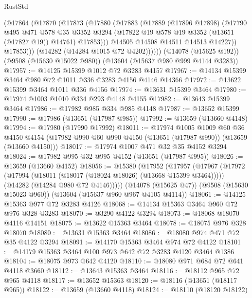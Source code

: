 \begin{lexlean}{RustStd}
\begin{coremodule}
              (@17864
                (@17870
                  (@17873
                    (@17880
                      (@17883
                        (@17889
                          (@17896 @17898)
                          (@17790
                            @495
                            @471
                            @578
                            @35
                            @3352
                            @3294
                            (@17822 @19 @578 @19 @3352 (@13651 (@17827 @19)) @14761)
                            @17853)))
                      @14505
                      @14508
                      @14511
                      @14513
                      @14227))
                  @17853)))
            (@14282 (@14284 @1015 @72 @4202))))))
    (@14078 (@15625 @192))
    (@9508 (@15630 @15022 @980))
    (@13604 (@15637 @980 @999 @4144 @3283))
@17957 := @14125 @15399 @1012 @72 @3283 @4157
@17967 := @14134 @15399 @3464 @980 @72 @1011 @336 @3283 @4156 @4146 @14366
@17972 := @13622 @15399 @3464 @1011 @336 @4156
@17974 := @13631 @15399 @3464
@17980 := @17974 @1003 @1010 @334 @293 @4148 @4155
@17982 := @13643 @15399 @3464
@17986 := @17982 @985 @334 @985 @4148
@17987 := @13652 @15399
@17990 := @17986 (@13651 (@17987 @985))
@17992 := @13659 (@13660 @4148)
@17994 := @17980 (@17990 @17992)
@18011 := @17974
    @1005
    @1009
    @60
    @36
    @4150
    @4154
    (@17982 @990 @60 @990 @4150 (@13651 (@17987 @990)) (@13659 (@13660 @4150)))
@18017 := @17974 @1007 @471 @32 @35 @4152 @3294
@18024 := @17982 @995 @32 @995 @4152 (@13651 (@17987 @995))
@18026 := @13659 (@13660 @4152)
@18056 := @15380
    (@17952
      (@17957
        (@17967
          (@17972 (@17994 (@18011 (@18017 (@18024 @18026) (@13668 @15399 @3464)))))
          (@14282 (@14284 @980 @72 @4146)))))
    (@14078 (@15625 @47))
    (@9508 (@15630 @15023 @960))
    (@13604 (@15637 @960 @967 @4105 @4114))
@18061 := @14125 @15363 @977 @72 @3283 @4126
@18068 := @14134 @15363 @3464 @960 @72 @976 @328 @3283
@18070 := @3290 @4122 @3294
@18073 := @18068 @18070 @4116 @14151
@18075 := @13622 @15363 @3464
@18078 := @18075 @976 @328 @18070
@18080 := @13631 @15363 @3464
@18086 := @18080 @974 @471 @72 @35 @4122 @3294
@18091 := @14170 @15363 @3464 @974 @72 @4122
@18101 := @14179 @15363 @3464 @100 @973 @642 @72 @3283 @4120 @3464 @1386
@18104 := @18075 @973 @642 @4120
@18110 := @18080 @971 @684 @72 @641 @4118 @3660
@18112 := @13643 @15363 @3464
@18116 := @18112 @965 @72 @965 @4118
@18117 := @13652 @15363
@18120 := @18116 (@13651 (@18117 @965))
@18122 := @13659 (@13660 @4118)
@18124 := @18110 (@18120 @18122)

\end{coremodule}
\end{lexlean}

